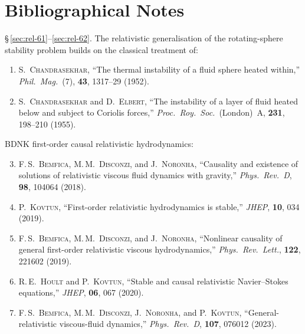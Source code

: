 \section*{Bibliographical Notes}

\noindent\S\,\ref{sec:rel-61}--\ref{sec:rel-62}.
The relativistic generalisation of the rotating-sphere stability
problem builds on the classical treatment of:

\begin{enumerate}
\item S.\ \textsc{Chandrasekhar}, ``The thermal instability of a
  fluid sphere heated within,'' \emph{Phil.\ Mag.}\ (7), \textbf{43},
  1317--29 (1952).

\item S.\ \textsc{Chandrasekhar} and D.\ \textsc{Elbert}, ``The
  instability of a layer of fluid heated below and subject to
  Coriolis forces,'' \emph{Proc.\ Roy.\ Soc.}\ (London)~A,
  \textbf{231}, 198--210 (1955).
\end{enumerate}

\noindent BDNK first-order causal relativistic hydrodynamics:

\begin{enumerate}\setcounter{enumi}{2}
\item F.\,S.\ \textsc{Bemfica}, M.\,M.\ \textsc{Disconzi}, and
  J.\ \textsc{Noronha}, ``Causality and existence of solutions of
  relativistic viscous fluid dynamics with gravity,''
  \emph{Phys.\ Rev.\ D}, \textbf{98}, 104064 (2018).

\item P.\ \textsc{Kovtun}, ``First-order relativistic hydrodynamics
  is stable,'' \emph{JHEP}, \textbf{10}, 034 (2019).

\item F.\,S.\ \textsc{Bemfica}, M.\,M.\ \textsc{Disconzi}, and
  J.\ \textsc{Noronha}, ``Nonlinear causality of general first-order
  relativistic viscous hydrodynamics,''
  \emph{Phys.\ Rev.\ Lett.}, \textbf{122}, 221602 (2019).

\item R.\,E.\ \textsc{Hoult} and P.\ \textsc{Kovtun},
  ``Stable and causal relativistic Navier--Stokes equations,''
  \emph{JHEP}, \textbf{06}, 067 (2020).

\item F.\,S.\ \textsc{Bemfica}, M.\,M.\ \textsc{Disconzi},
  J.\ \textsc{Noronha}, and P.\ \textsc{Kovtun},
  ``General-relativistic viscous-fluid dynamics,''
  \emph{Phys.\ Rev.\ D}, \textbf{107}, 076012 (2023).
\end{enumerate}

